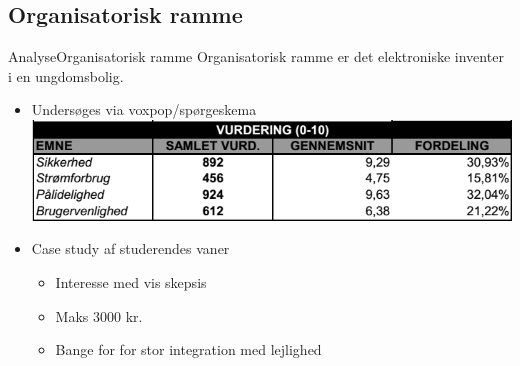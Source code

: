 \subsection{Organisatorisk ramme}
\begin{frame}{Analyse}{Organisatorisk ramme}
Organisatorisk ramme er det elektroniske inventer i en ungdomsbolig.
\begin{itemize}
\item Undersøges via voxpop/spørgeskema
\includegraphics[scale=0.5]{contens/spgskema.png}
\item Case study af studerendes vaner
\begin{itemize}
\item Interesse med vis skepsis
\item Maks 3000 kr.
\item Bange for for stor integration med lejlighed
\end{itemize}
\end{itemize}
\end{frame}